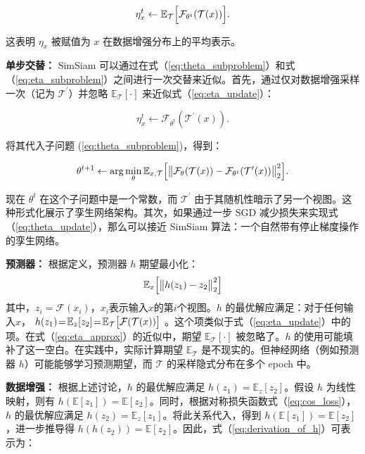 \documentclass[master]{thesis-uestc}
\begin{document}
\begin{equation}
\label{eq:eta_update}
\eta_{x}^{t}\leftarrow\mathbb{E}_{\mathcal{T}}\Big{[}\mathcal{F}_{\theta^{t}}( \mathcal{T}(x))\Big{]}.
\end{equation}

这表明 $\eta_{x}$ 被赋值为 $x$ 在数据增强分布上的平均表示。

\textbf{单步交替：} SimSiam 可以通过在式（\ref{eq:theta_subproblem}）和式（\ref{eq:eta_subproblem}）之间进行一次交替来近似。首先，通过仅对数据增强采样一次（记为 $\mathcal{T}^{\prime}$）并忽略 $\mathbb{E}_{\mathcal{T}}[\cdot]$ 来近似式（\ref{eq:eta_update}）：

\begin{equation}
\label{eq:eta_approx}
\eta_{x}^{t}\leftarrow\mathcal{F}_{\theta^{t}}(\mathcal{T}^{\prime}(x)).
\end{equation}

将其代入子问题 (\ref{eq:theta_subproblem})，得到：

\begin{equation}
\label{eq:theta_update}
\theta^{t+1}\leftarrow\arg\min_{\theta}\mathbb{E}_{x,\mathcal{T}}\Big{[}\big{\| }\mathcal{F}_{\theta}(\mathcal{T}(x))-\mathcal{F}_{\theta^{t}}(\mathcal{T}^{ \prime}(x))\big{\|}_{2}^{2}\Big{]}.
\end{equation}

现在 $\theta^{t}$ 在这个子问题中是一个常数，而 $\mathcal{T}^{\prime}$ 由于其随机性暗示了另一个视图。这种形式化展示了孪生网络架构。其次，如果通过一步 SGD 减少损失来实现式（\ref{eq:theta_update}），那么可以接近 SimSiam 算法：一个自然带有停止梯度操作的孪生网络。

\textbf{预测器：} 根据定义，预测器 $h$ 期望最小化：
\begin{equation}
\mathbb{E}_{x}\Big{[}\big{\|}h(z_{1})-z_{2}\big{\|}_{2}^{2}\Big{]} 
\label{eq:target_of_h}
\end{equation}
其中，$z_i = \mathcal{F}(x_i)$，$x_i$表示输入$x$的第$i$个视图。$h$ 的最优解应满足：对于任何输入$x$， $h(z_{1})\!=\!\mathbb{E}_{z}[z_{2}]\!=\!\mathbb{E}_{\mathcal{T}}\big{[}\mathcal{F}( \mathcal{T}(x))\big{]}$ 。这个项类似于式（\ref{eq:eta_update}）中的项。在式（\ref{eq:eta_approx}）的近似中，期望 $\mathbb{E}_{\mathcal{T}}[\cdot]$ 被忽略了。$h$ 的使用可能填补了这一空白。在实践中，实际计算期望 $\mathbb{E}_{\mathcal{T}}$ 是不现实的。但神经网络（例如预测器 $h$）可能能够学习预测期望，而 $\mathcal{T}$ 的采样隐式分布在多个 epoch 中。

\textbf{数据增强：} 根据上述讨论，$h$ 的最优解应满足 $h(z_1) = \mathbb{E}_z[z_2]$。假设 $h$ 为线性映射，则有 $h(\mathbb{E}[z_1]) = \mathbb{E}[z_2]$。同时，根据对称损失函数式（\ref{eq:cos_loss}），$h$ 的最优解应满足 $h(z_2) = \mathbb{E}_z[z_1]$。将此关系代入，得到 $h(\mathbb{E}[z_1]) = \mathbb{E}[z_2]$，进一步推导得 $h(h(z_2)) = \mathbb{E}[z_2]$。因此，式（\ref{eq:derivation_of_h}）可表示为：
\end{document}

